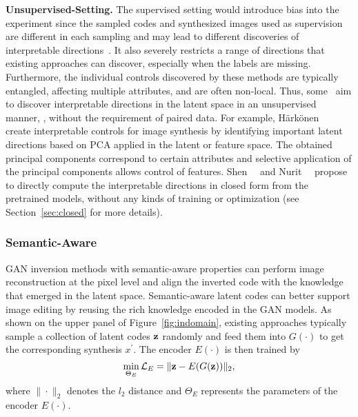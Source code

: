 \noindent\textbf{Unsupervised-Setting.} 
The supervised setting would introduce bias into the experiment since the sampled codes and synthesized images used as supervision are different in each sampling and may lead to different discoveries of interpretable directions~\cite{shen2020closedform}. 
It also severely restricts a range of directions that existing approaches can discover, especially when the labels are missing. 
Furthermore, the individual controls discovered by these methods are typically entangled, affecting multiple attributes, and are often non-local.
Thus, some~\cite{voynov2020latent,lu2020discovery,eric2020GANSpace,cherepkov2020navigating} aim to discover interpretable directions in the latent space in an unsupervised manner, \ie, without the requirement of paired data.
For example, Härkönen~\etal~\cite{eric2020GANSpace} create interpretable controls for image synthesis by identifying important latent directions based on PCA applied in the latent or feature space. The obtained principal components correspond to certain attributes and selective application of the principal components allows control of features.
Shen~\etal~\cite{shen2020closedform} and Nurit~\etal~\cite{nurit2020steerability} propose to directly compute the interpretable directions in closed form from the pretrained models, without any kinds of training or optimization (see Section~\ref{sec:closed} for more details).

\subsubsection{Semantic-Aware}
\label{sec:semantic-aware}

GAN inversion methods with semantic-aware properties can perform image reconstruction at the pixel level and align the inverted code with the knowledge that emerged in the latent space. 
Semantic-aware latent codes can better support image editing by reusing the rich knowledge encoded in the GAN models.
As shown on the upper panel of Figure~\ref{fig:indomain}, existing approaches typically sample a collection of latent codes $\mathbf{z}$ randomly and feed them into $G(\cdot)$ to get the corresponding synthesis $x^{\prime}$. 
The encoder $E(\cdot)$ is then trained by
\begin{equation}
\min_{\Theta_{E}} \mathcal{L}_{E}=\|\mathbf{z}-E(G(\mathbf{z}))\|_{2},
\end{equation}
where $\|\cdot\|_{2}$ denotes the $l_{2}$ distance and $\Theta_{E}$ represents the parameters of the encoder $E(\cdot)$.

